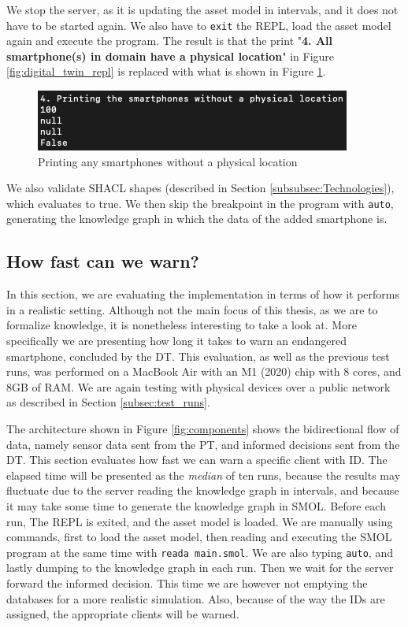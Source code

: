\documentclass{article}
\begin{document}
We stop the server, as it is updating the asset model in intervals, and it does not have to be started again. We also have to \verb|exit| the REPL, load the asset model again and execute the program. 
The result is that the print "\textbf{4. All smartphone(s) in domain have a physical location}" in Figure \ref{fig:digital_twin_repl} is replaced with what is shown in Figure \ref{fig:manually_adding_smartphone}.

\begin{figure}
    \centering
    \includegraphics[scale=0.70]{graphics/manually_adding_smartphone.png}
    \caption{Printing any smartphones without a physical location}
    \label{fig:manually_adding_smartphone}
\end{figure}

We also validate SHACL shapes (described in Section \ref{subsubsec:Technologies}), which evaluates to true. We then skip the breakpoint in the program with \verb|auto|, generating the knowledge graph in which the data of the added smartphone is.


\subsection{How fast can we warn?}\label{subsec:time_to_warn}
In this section, we are evaluating the implementation in terms of how it performs in a realistic setting. Although not the main focus of this thesis, as we are to formalize knowledge, it is nonetheless interesting to take a look at. More specifically we are presenting how long it takes to warn an endangered smartphone, concluded by the DT.  
This evaluation, as well as the previous test runs, was performed on a MacBook Air with an M1 (2020) chip with 8 cores, and 8GB of RAM. We are again testing with physical devices over a public network as described in Section \ref{subsec:test_runs}.

The architecture shown in Figure \ref{fig:components} shows the bidirectional flow of data, namely sensor data sent from the PT, and informed decisions sent from the DT. This section evaluates how fast we can warn a specific client with ID. The elapsed time will be presented as the \emph{median} of ten runs, because the results may fluctuate due to the server reading the knowledge graph in intervals, and because it may take some time to generate the knowledge graph in SMOL. Before each run, The REPL is exited, and the asset model is loaded. We are manually using commands, first to load the asset model, then reading and executing the SMOL program at the same time with \verb|reada main.smol|. We are also typing \verb|auto|, and lastly dumping to the knowledge graph in each run. Then we wait for the server forward the informed decision. This time we are however not emptying the databases for a more realistic simulation. Also, because of the way the IDs are assigned, the appropriate clients will be warned.
\end{document}
